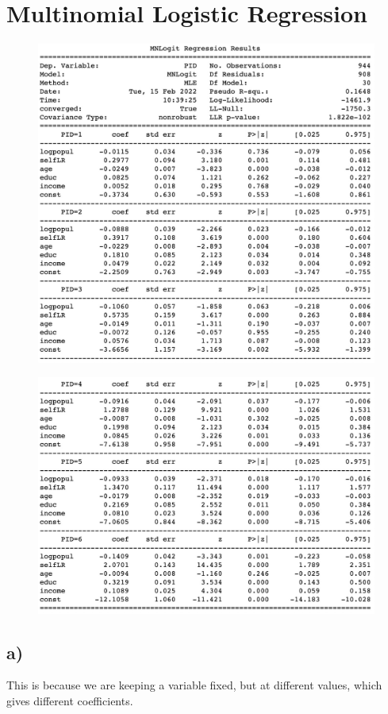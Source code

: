 \documentclass[12pt, letterpaper]{article}
\begin{document}
\newpage
\section{Multinomial Logistic Regression}
\begin{figure}[h!]
  \includegraphics[scale=0.33]{./images/7.jpg}
\end{figure}
\begin{figure}[h!]
  \includegraphics[scale=0.33]{./images/7_2.jpg}
\end{figure}
\clearpage
\subsection*{a)} This is because we are keeping a variable fixed, but at different values, which gives different coefficients.
\end{document}
